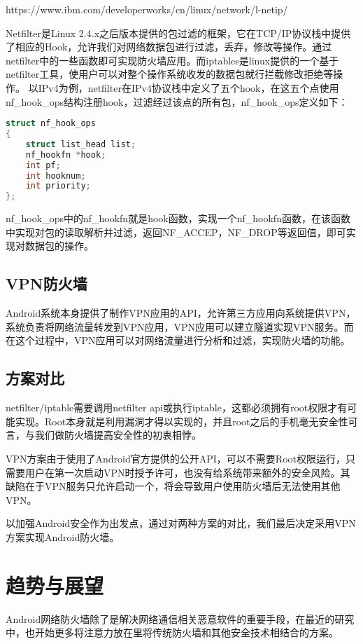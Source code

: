 \documentclass{article}
\begin{document}
https://www.ibm.com/developerworks/cn/linux/network/l-netip/

Netfilter是Linux 2.4.x之后版本提供的包过滤的框架，它在TCP/IP协议栈中提供了相应的Hook，允许我们对网络数据包进行过滤，丢弃，修改等操作。通过netfilter中的一些函数即可实现防火墙应用。而iptables是linux提供的一个基于netfilter工具，使用户可以对整个操作系统收发的数据包就行拦截修改拒绝等操作。
以IPv4为例，netfilter在IPv4协议栈中定义了五个hook，在这五个点使用nf\_hook\_ops结构注册hook，过滤经过该点的所有包，nf\_hook\_ops定义如下：

\begin{lstlisting}[language=c]
struct nf_hook_ops
{
    struct list_head list;
    nf_hookfn *hook;
    int pf;
    int hooknum;
    int priority;
};
\end{lstlisting}

nf\_hook\_ops中的nf\_hookfn就是hook函数，实现一个nf\_hookfn函数，在该函数中实现对包的读取解析并过滤，返回NF\_ACCEP，NF\_DROP等返回值，即可实现对数据包的操作。

\subsection{VPN防火墙}

Android系统本身提供了制作VPN应用的API，允许第三方应用向系统提供VPN，系统负责将网络流量转发到VPN应用，VPN应用可以建立隧道实现VPN服务。而在这个过程中，VPN应用可以对网络流量进行分析和过滤，实现防火墙的功能。

\subsection{方案对比}
netfilter/iptable需要调用netfilter api或执行iptable，这都必须拥有root权限才有可能实现。Root本身就是利用漏洞才得以实现的，并且root之后的手机毫无安全性可言，与我们做防火墙提高安全性的初衷相悖。

VPN方案由于使用了Android官方提供的公开API，可以不需要Root权限运行，只需要用户在第一次启动VPN时授予许可，也没有给系统带来额外的安全风险。其缺陷在于VPN服务只允许启动一个，将会导致用户使用防火墙后无法使用其他VPN。

以加强Android安全作为出发点，通过对两种方案的对比，我们最后决定采用VPN方案实现Android防火墙。

\section{趋势与展望}

Android网络防火墙除了是解决网络通信相关恶意软件的重要手段，在最近的研究中，也开始更多将注意力放在里将传统防火墙和其他安全技术相结合的方案。
\end{document}

